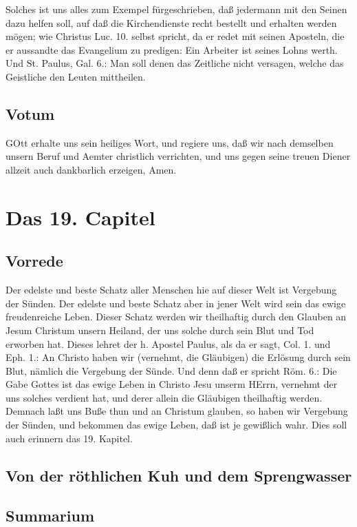Solches ist uns alles zum Exempel fürgeschrieben, daß jedermann mit den Seinen dazu helfen soll, auf daß die Kirchendienste recht bestellt und erhalten werden mögen; wie Christus Luc. 10. selbst spricht, da er redet mit seinen Aposteln, die er aussandte das Evangelium zu predigen: Ein Arbeiter ist seines Lohns werth. Und St. Paulus, Gal. 6.: Man soll denen das Zeitliche nicht versagen, welche das Geistliche den Leuten mittheilen.

\section{Votum}

GOtt erhalte uns sein heiliges Wort, und regiere uns, daß wir nach demselben unsern Beruf und Aemter christlich verrichten, und uns gegen seine treuen Diener allzeit auch dankbarlich erzeigen, Amen.

\chapter{Das 19. Capitel}

\section{Vorrede}

Der edelste und beste Schatz aller Menschen hie auf dieser Welt ist Vergebung der Sünden. Der edelste und beste Schatz aber in jener Welt wird sein das ewige freudenreiche Leben. Dieser Schatz werden wir theilhaftig durch den Glauben an Jesum Christum unsern Heiland, der uns solche durch sein Blut und Tod erworben hat. Dieses lehret der h. Apostel Paulus, als da er sagt, Col. 1. und Eph. 1.: An Christo haben wir (vernehmt, die Gläubigen) die Erlösung durch sein Blut, nämlich die Vergebung der Sünde. Und denn daß er spricht Röm. 6.: Die Gabe Gottes ist das ewige Leben in Christo Jesu unserm HErrn, vernehmt der uns solches verdient hat, und derer allein die Gläubigen theilhaftig werden. Demnach laßt uns Buße thun und an Christum glauben, so haben wir
Vergebung der Sünden, und bekommen das ewige Leben, daß ist je gewißlich wahr. Dies soll auch erinnern das 19. Kapitel.

\section{Von der röthlichen Kuh und dem Sprengwasser}

\section{Summarium}

